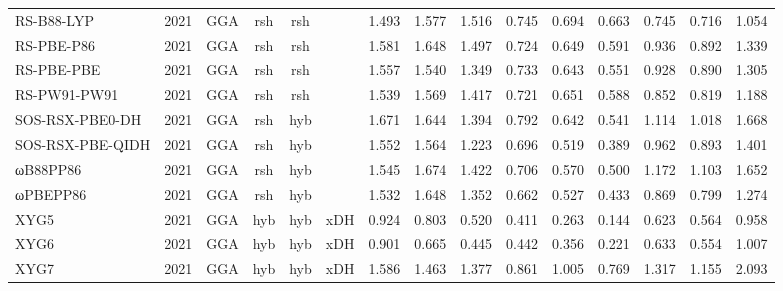 \begin{landscape}
\begin{longtable}{lcccccrrrrrrrrr}
    RS-B88-LYP       & 2021 & GGA  & rsh      & rsh         &           & 1.493             & 1.577             & 1.516  & 0.745              & 0.694             & 0.663  & 0.745   & 0.716 & 1.054 \\
    RS-PBE-P86       & 2021 & GGA  & rsh      & rsh         &           & 1.581             & 1.648             & 1.497  & 0.724              & 0.649             & 0.591  & 0.936   & 0.892 & 1.339 \\
    RS-PBE-PBE       & 2021 & GGA  & rsh      & rsh         &           & 1.557             & 1.540             & 1.349  & 0.733              & 0.643             & 0.551  & 0.928   & 0.890 & 1.305 \\
    RS-PW91-PW91     & 2021 & GGA  & rsh      & rsh         &           & 1.539             & 1.569             & 1.417  & 0.721              & 0.651             & 0.588  & 0.852   & 0.819 & 1.188 \\
    SOS-RSX-PBE0-DH  & 2021 & GGA  & rsh      & hyb         &           & 1.671             & 1.644             & 1.394  & 0.792              & 0.642             & 0.541  & 1.114   & 1.018 & 1.668 \\
    SOS-RSX-PBE-QIDH & 2021 & GGA  & rsh      & hyb         &           & 1.552             & 1.564             & 1.223  & 0.696              & 0.519             & 0.389  & 0.962   & 0.893 & 1.401 \\
    ωB88PP86         & 2021 & GGA  & rsh      & hyb         &           & 1.545             & 1.674             & 1.422  & 0.706              & 0.570             & 0.500  & 1.172   & 1.103 & 1.652 \\
    ωPBEPP86         & 2021 & GGA  & rsh      & hyb         &           & 1.532             & 1.648             & 1.352  & 0.662              & 0.527             & 0.433  & 0.869   & 0.799 & 1.274 \\
    XYG5             & 2021 & GGA  & hyb      & hyb         & xDH       & 0.924             & 0.803             & 0.520  & 0.411              & 0.263             & 0.144  & 0.623   & 0.564 & 0.958 \\
    XYG6             & 2021 & GGA  & hyb      & hyb         & xDH       & 0.901             & 0.665             & 0.445  & 0.442              & 0.356             & 0.221  & 0.633   & 0.554 & 1.007 \\
    XYG7             & 2021 & GGA  & hyb      & hyb         & xDH       & 1.586             & 1.463             & 1.377  & 0.861              & 1.005             & 0.769  & 1.317   & 1.155 & 2.093 \\

\end{longtable}
\end{landscape}
